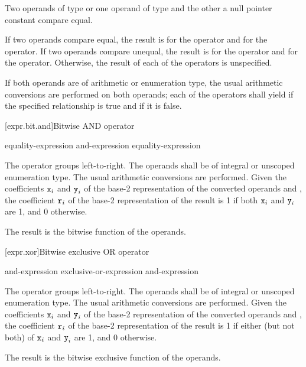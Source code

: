 \pnum
Two operands of type  or one operand of type
 and the other a null pointer constant compare equal.

\pnum
If two operands compare equal, the result is  for
the \tcode{==} operator and  for the \tcode{!=} operator. If two operands
compare unequal, the result is  for the \tcode{==} operator and
 for the \tcode{!=} operator. Otherwise, the result of each of the
operators is unspecified.

\pnum
If both operands are of arithmetic or enumeration type, the usual arithmetic
conversions are performed on both operands; each of the operators shall yield
 if the specified relationship is true and  if it is
false.

[expr.bit.and]{Bitwise AND operator}%
%
%
%
%

\begin{bnf}
\br
    equality-expression\br
    and-expression \terminal{\&} equality-expression
\end{bnf}

\pnum
The \tcode{\&} operator groups left-to-right.
The operands shall be of integral or unscoped enumeration type.
The usual arithmetic conversions are performed.
Given the coefficients $\texttt{x}_i$ and $\texttt{y}_i$
of the base-2 representation
of the converted operands  and ,
the coefficient $\texttt{r}_i$
of the base-2 representation of the result 
is 1 if both $\texttt{x}_i$ and $\texttt{y}_i$ are 1, and 0 otherwise.
\begin{note}
The result is the bitwise  function of the operands.
\end{note}

[expr.xor]{Bitwise exclusive OR operator}%
%
%

\begin{bnf}
\br
    and-expression\br
    exclusive-or-expression \terminal{\caret} and-expression
\end{bnf}

\pnum
The \tcode{\^} operator groups left-to-right.
The operands shall be of integral or unscoped enumeration type.
The usual arithmetic conversions are performed.
Given the coefficients $\texttt{x}_i$ and $\texttt{y}_i$
of the base-2 representation
of the converted operands  and ,
the coefficient $\texttt{r}_i$
of the base-2 representation of the result 
is 1 if either (but not both) of $\texttt{x}_i$ and $\texttt{y}_i$ are 1,
and 0 otherwise.
\begin{note}
The result is the bitwise exclusive  function of the operands.
\end{note}

